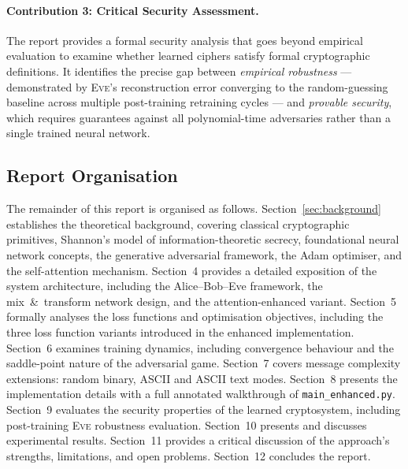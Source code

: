 \documentclass[12pt, a4paper]{article}
\newcommand{\eve}{\textsc{Eve}}
\newcommand{\code}[1]{\texttt{\color{CodeRed}#1}}
\begin{document}
\paragraph{Contribution 3: Critical Security Assessment.}
The report provides a formal security analysis that goes beyond
empirical evaluation to examine whether learned ciphers satisfy formal
cryptographic definitions. It identifies the precise gap between
\emph{empirical robustness} — demonstrated by \eve{}'s reconstruction
error converging to the random-guessing baseline across multiple
post-training retraining cycles — and \emph{provable security}, which
requires guarantees against all polynomial-time adversaries rather than
a single trained neural network.

\subsection{Report Organisation}
\label{subsec:organisation}

The remainder of this report is organised as follows.
Section~\ref{sec:background} establishes the theoretical background,
covering classical cryptographic primitives, Shannon's model of
information-theoretic secrecy, foundational neural network concepts,
the generative adversarial framework, the Adam optimiser, and the
self-attention mechanism.
Section~4 provides a detailed exposition of the system architecture,
including the Alice–Bob–Eve framework, the mix~\&~transform network
design, and the attention-enhanced variant.
Section~5 formally analyses the loss functions and optimisation
objectives, including the three loss function variants introduced in
the enhanced implementation.
Section~6 examines training dynamics, including convergence behaviour
and the saddle-point nature of the adversarial game.
Section~7 covers message complexity extensions: random binary, ASCII
and ASCII text modes.
Section~8 presents the implementation details with a full annotated
walkthrough of \code{main\_enhanced.py}.
Section~9 evaluates the security properties of the learned
cryptosystem, including post-training \eve{} robustness evaluation.
Section~10 presents and discusses experimental results.
Section~11 provides a critical discussion of the approach's strengths,
limitations, and open problems.
Section~12 concludes the report.


\newpage
\end{document}
